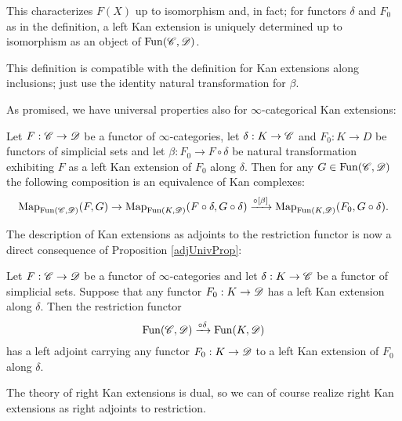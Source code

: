 \documentclass[../../thesis.tex]{subfiles}
\begin{document}
\begin{remark}
    This characterizes $F(X)$ up to isomorphism and, in fact; for functors $\delta$ and $F_0$ as in the definition, a left Kan extension is uniquely determined up to isomorphism as an object of $\mathrm{Fun}(\mathscr{C}, \mathscr{D})$.
\end{remark}
\begin{remark}
    This definition is compatible with the definition for Kan extensions along inclusions; just use the identity natural transformation for $\beta$.
\end{remark}
As promised, we have universal properties also for $\infty$-categorical Kan extensions:
\begin{proposition}
    Let $F : \mathscr{C} \to \mathscr{D}$ be a functor of $\infty$-categories, let $\delta : K\to \mathscr{C}$ and $F_0: K \to D$ be functors of simplicial sets and let $\beta : F_0 \to F \circ \delta$ be natural transformation exhibiting $F$ as a left Kan extension of $F_0$ along $\delta$.
    Then for any $G \in \mathrm{Fun}(\mathscr{C}, \mathscr{D})$ the following composition is an equivalence of Kan complexes:
    \[
        \mathrm{Map}_{\mathrm{Fun}(\mathscr{C},\mathscr{D})}(F,G) \to \mathrm{Map}_{\mathrm{Fun}(K,\mathscr{D})}(F \circ \delta , G \circ \delta) \xrightarrow{\circ [\beta]} \mathrm{Map}_{\mathrm{Fun}(K,\mathscr{D})}(F_0, G\circ \delta).
    \]
\end{proposition}
The description of Kan extensions as adjoints to the restriction functor is now a direct consequence of Proposition \ref{adjUnivProp}:
\begin{corollary}
    Let $F : \mathscr{C} \to \mathscr{D}$ be a functor of $\infty$-categories and let $\delta : K\to \mathscr{C}$ be a functor of simplicial sets.
    Suppose that any functor $F_0 : K \to \mathscr{D}$ has a left Kan extension along $\delta$.
    Then the restriction functor
    \[
        \mathrm{Fun}(\mathscr{C}, \mathscr{D}) \xrightarrow{\circ \delta} \mathrm{Fun}(K, \mathscr{D})
    \]
    has a left adjoint carrying any functor $F_0 : K \to \mathscr{D}$ to a left Kan extension of $F_0$ along $\delta$.
\end{corollary}
The theory of right Kan extensions is dual, so we can of course realize right Kan extensions as right adjoints to restriction.
\end{document}
